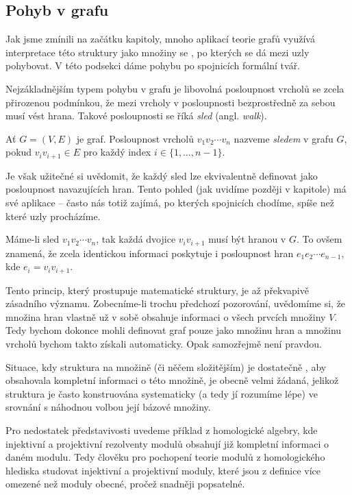 \subsection{Pohyb v grafu}
\label{ssec:pohyb-v-grafu}

Jak jsme zmínili na začátku kapitoly, mnoho aplikací teorie grafů využívá
interpretace této struktury jako množiny  se , po
kterých se dá mezi uzly pohybovat. V této podsekci dáme pohybu po spojnicích
formální tvář.

Nejzákladnějším typem pohybu v grafu je libovolná posloupnost vrcholů se zcela
přirozenou podmínkou, že mezi vrcholy v posloupnosti bezprostředně za sebou musí
vést hrana. Takové posloupnosti se říká \emph{sled} (angl. \emph{walk}).

\begin{definition}
\label{def:sled-poprve}
 Ať $G = (V,E)$ je graf. Posloupnost vrcholů $v_1v_2\cdots v_n$ nazveme
 \emph{sledem} v grafu $G$, pokud $v_i v_{i+1} \in E$ pro každý index ${i \in
 \{1,\ldots,n-1\}}$.
\end{definition}

Je však užitečné si uvědomit, že každý sled lze ekvivalentně definovat jako
posloupnost navazujících hran. Tento pohled (jak uvidíme později v kapitole) má
své aplikace -- často nás totiž zajímá, po kterých spojnicích chodíme, spíše než
které uzly procházíme.

Máme-li sled $v_1v_2 \cdots v_n$, tak každá dvojice $v_iv_{i+1}$ musí být hranou
v $G$. To ovšem znamená, že zcela identickou informaci poskytuje i posloupnost
hran $e_1e_2 \cdots e_{n-1}$, kde $e_i = v_iv_{i+1}$.

\begin{remark}
 Tento princip, který prostupuje matematické struktury, je až překvapivě
 zásadního významu. Zobecníme-li trochu předchozí pozorování, uvědomíme si, že
 množina hran vlastně už v sobě obsahuje informaci o všech prvcích množiny $V$.
 Tedy bychom dokonce mohli definovat graf pouze jako množinu hran a množinu
 vrcholů bychom takto získali automaticky. Opak samozřejmě není pravdou.

 Situace, kdy struktura na množině (či něčem složitějším) je dostatečně
 , aby obsahovala kompletní informaci o této množině, je obecně velmi
 žádaná, jelikož struktura je často konstruována systematicky (a tedy jí
 rozumíme lépe) ve srovnání s náhodnou volbou její bázové množiny.

 Pro nedostatek představivosti uvedeme příklad z homologické algebry, kde
 injektivní a projektivní rezolventy modulů obsahují již kompletní informaci o
 daném modulu. Tedy člověku pro pochopení teorie modulů z homologického hlediska
  studovat injektivní a projektivní moduly, které jsou z definice více
 omezené než moduly obecné, pročež snadněji popsatelné.
\end{remark}

